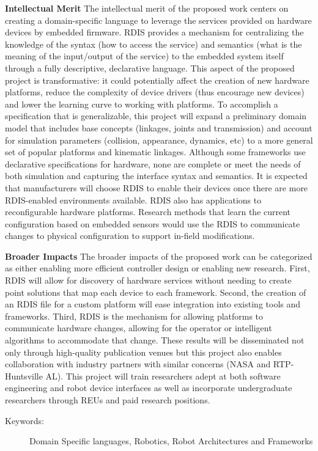 \textbf{Intellectual Merit}
The intellectual merit of the proposed work centers on creating a domain-specific language to leverage the services provided on hardware devices by embedded firmware.  RDIS  provides a mechanism for centralizing the knowledge of the syntax (how to access the service) and semantics (what is the meaning of the input/output of the service) to the embedded system itself through a fully descriptive, declarative language.  This aspect of the proposed project is transformative: it could potentially affect the creation of new hardware platforms, reduce the complexity of device drivers (thus encourage new devices) and lower the learning curve to working with platforms.   To accomplish a specification that is generalizable, this project will expand a preliminary domain model that includes base concepts (linkages, joints and transmission) and account for simulation parameters (collision, appearance, dynamics, etc) to a more general set of popular platforms and kinematic linkages.  Although some frameworks use declarative specifications for hardware, none are complete or meet the needs of both simulation and capturing the interface syntax and semantics. It is expected that manufacturers will choose RDIS to enable their devices once there are more RDIS-enabled environments available.  RDIS also has applications to reconfigurable hardware platforms.  Research methods that learn the current configuration based on embedded sensors would use the RDIS to communicate changes to physical configuration to support in-field modifications.

\textbf{Broader Impacts}
The broader impacts of the proposed work can be categorized as either enabling more efficient controller design or enabling new research.   First, RDIS will allow for discovery of hardware services without needing to create point solutions that map each device to each framework.  Second, the creation of an RDIS file for a custom platform will ease integration into existing tools and frameworks.  Third, RDIS is the mechanism for allowing platforms to communicate hardware changes, allowing for the operator or intelligent algorithms to accommodate that change.  These results will be disseminated not only through high-quality publication venues but this project also enables collaboration with industry partners with similar concerns (NASA and RTP-Huntsville AL).   This project will train researchers adept at both software engineering and robot device interfaces as well as incorporate undergraduate researchers through REUs and paid research positions.

\begin{description}
	\item[Keywords:]
   Domain Specific languages, Robotics, Robot Architectures and Frameworks
\end{description}
